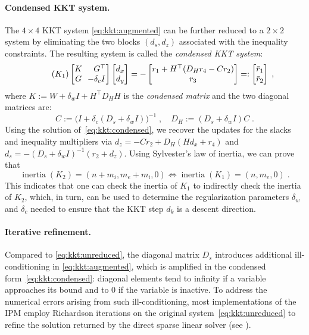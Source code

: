 \documentclass[smallextended]{svjour3}
\DeclareMathOperator{\inertia}{inertia}
\begin{document}
\paragraph{Condensed KKT system.}
The $4 \times 4$ KKT system \eqref{eq:kkt:augmented} can be further
reduced to a $2 \times 2$ system by eliminating the two blocks
$(d_s, d_z)$ associated with the inequality constraints.
The resulting system is called the \emph{condensed KKT system}:
\begin{equation}
  \label{eq:kkt:condensed}
  \tag{$K_1$}
  \setlength\arraycolsep{3pt}
  \begin{bmatrix}
    K & \phantom{-} G^\top \\
    G & -\delta_c I
  \end{bmatrix}
  \begin{bmatrix}
    d_x \\ d_y
  \end{bmatrix}
  =
  -
  \begin{bmatrix}
    r_1 + H^\top(D_H r_4 - C r_2) \\ r_3
  \end{bmatrix}
  =:
  \begin{bmatrix}
    \bar{r}_1 \\ \bar{r}_2
  \end{bmatrix}
   \; ,
\end{equation}
where $K := W + \delta_w I  + H^\top D_H H$ is the \emph{condensed matrix}
and the two diagonal matrices are:
\begin{equation}
  C := \big(I + \delta_c(D_s + \delta_w I)\big)^{-1} \; , \quad
  D_H := (D_s + \delta_w I) C \; .
\end{equation}
Using the solution of~\eqref{eq:kkt:condensed},
we recover the updates for the slacks and inequality multipliers via
$d_z = -C r_2 + D_H(H d_x + r_4)$ and $d_s = -(D_s + \delta_w I)^{-1}(r_2 + d_z)$.
Using Sylvester's law of inertia, we can prove that
\begin{equation}
  \label{eq:ipm:inertia}
  \inertia(K_2) = (n+m_i, m_e+m_i, 0) \iff
  \inertia(K_1) = (n, m_e, 0) \;.
\end{equation}
This indicates that one can check the inertia of $K_1$ to indirectly check the inertia of $K_2$, which, in turn, can be used to determine the regularization parameters $\delta_w$ and $\delta_c$ needed to ensure that the KKT step $d_k$ is a descent direction.

\paragraph{Iterative refinement.}
Compared to \eqref{eq:kkt:unreduced}, the diagonal matrix $D_s$ introduces additional ill-conditioning in \eqref{eq:kkt:augmented}, which is amplified in the condensed form~\eqref{eq:kkt:condensed}: diagonal elements tend to infinity if a variable approaches its bound and to $0$ if the variable is inactive.
To address the numerical errors arising from such ill-conditioning, most implementations of the IPM employ Richardson iterations on the original system~\eqref{eq:kkt:unreduced} to refine the solution returned by the direct sparse linear solver (see \cite[Section 3.10]{wachter2006implementation}).
\end{document}
